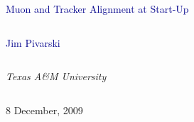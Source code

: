 \documentclass[compress]{beamer}
\begin{document}
\begin{frame}
\vfill
\begin{center}
\textcolor{darkblue}{\Large Muon and Tracker Alignment at Start-Up}

\vfill
\begin{columns}
\begin{center}
\large
\textcolor{darkblue}{Jim Pivarski}
\end{center}
\end{columns}

\begin{columns}
\begin{center}
\scriptsize
{\it Texas A\&M University}
\end{center}
\end{columns}

\vfill
 8 December, 2009

\end{center}
\end{frame}


\small
\end{document}

